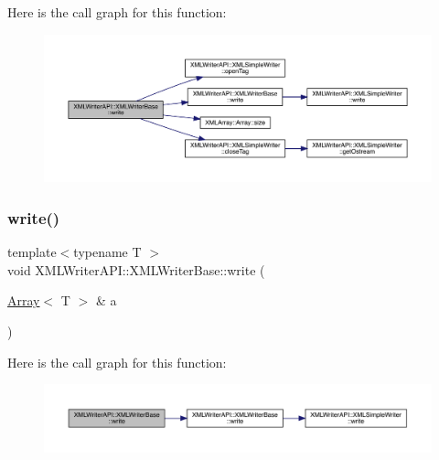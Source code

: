 Here is the call graph for this function\+:
\nopagebreak
\begin{figure}[H]
\begin{center}
\leavevmode
\includegraphics[width=350pt]{d5/df5/classXMLWriterAPI_1_1XMLWriterBase_a85d9236f5ec6ccc3c8559d4ec431bf6b_cgraph}
\end{center}
\end{figure}
\mbox{\label{classXMLWriterAPI_1_1XMLWriterBase_a5475e21d716c65a21d620b4cde0c9ca1}} 
\subsubsection{\texorpdfstring{write()}{write()}\hspace{0.1cm}{\footnotesize\ttfamily [25/26]}}
{\footnotesize\ttfamily template$<$typename T $>$ \\
void X\+M\+L\+Writer\+A\+P\+I\+::\+X\+M\+L\+Writer\+Base\+::write (\begin{DoxyParamCaption}\item[{\mbox{\hyperlink{classXMLArray_1_1Array}{Array}}$<$ T $>$ \&}]{a }\end{DoxyParamCaption})\hspace{0.3cm}{\ttfamily [inline]}}

Here is the call graph for this function\+:
\nopagebreak
\begin{figure}[H]
\begin{center}
\leavevmode
\includegraphics[width=350pt]{d5/df5/classXMLWriterAPI_1_1XMLWriterBase_a5475e21d716c65a21d620b4cde0c9ca1_cgraph}
\end{center}
\end{figure}
\mbox{\label{classXMLWriterAPI_1_1XMLWriterBase_a5475e21d716c65a21d620b4cde0c9ca1}} 
